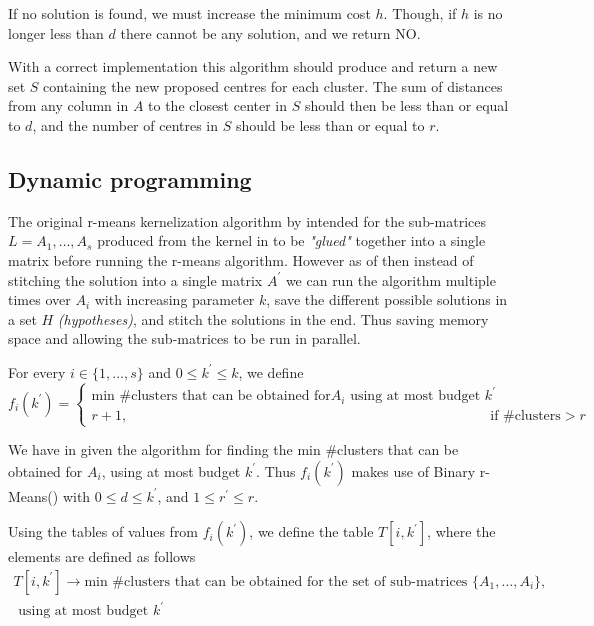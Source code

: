 \documentclass[a4paper]{article}
\begin{document}
If no solution is found, we must increase the minimum cost $h$. Though, if $h$ is no longer less than $d$ there cannot be any solution, and we return NO.



With a correct implementation this algorithm should produce and return a new set $S$ containing the new proposed
centres for each cluster. The sum of distances from any column in $A$ to the closest center in $S$ should then be
less than or equal to $d$, and the number of centres in $S$ should be less than or equal to $r$.

\subsection{Dynamic programming}
\label{sec:algo:dynamic-result}
The original r-means kernelization algorithm by \cite{fomin_golovach_panolan_2020}
intended for the sub-matrices $L=A_1,\dots,A_s$ produced from the kernel in  to be \textit{"glued"} together
into a single matrix before running the r-means algorithm. However as of  then instead of stitching the solution
into a single matrix $A^\prime$ we can run the algorithm multiple times over $A_i$ with increasing parameter $k$,
save the different possible solutions in a set $H$ \textit{(hypotheses)}, and stitch the solutions in the end. Thus saving
memory space and allowing the sub-matrices to be run in parallel.

For every $i \in \{1,\dots,s\}$ and $0 \leq k^\prime \leq k$, we define
\[ f_i(k^\prime) =
    \begin{cases}
        \text{min \#clusters that can be obtained for} A_i \text{ using at most budget } k^\prime &                                \\
        r+1,                                                                               & \quad \text{if \#clusters} > r
    \end{cases}
\]

We have in  given the algorithm for finding the min \#clusters that can be obtained for $A_i$,
using at most budget $k^\prime$. Thus $f_i(k^\prime)$ makes use of Binary r-Means()
with $0 \leq d \leq k^\prime$, and $1 \leq r^\prime \leq r$.

Using the tables of values from $f_i(k^\prime)$, we define the table $T[i,k^\prime]$, where the elements are defined as follows
\[
    \begin{split}
        T[i, k^\prime] \rightarrow \text{min \#clusters that can be obtained for the set of sub-matrices } \{A_1, \dots, A_i\}, \\
        \text{ using at most budget } k^\prime
    \end{split}
\]
\end{document}
